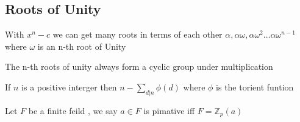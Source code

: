  
\subsection{Roots of Unity}
With \(x^n - c\) we can get many roots in terms of each other \(\alpha , \alpha \omega , \alpha \omega ^2 \ldots \alpha \omega ^{n - 1} \)
where \(\omega\) is an n-th root of Unity

The n-th roots of unity always form a cyclic group under multiplication

\begin{theorem}
    If \(n\) is a positive interger
    then \(n - \sum_{d | n} \phi(d)\) 
    where \(\phi\) is the torient funtion  
\end{theorem}


\begin{definition}
    \label{def:primitive element}
    Let \(F\) be a finite feild , we say \(a \in F\) is pimative iff \(F = \mathbb{Z} _p (a)\) 
\end{definition}  

